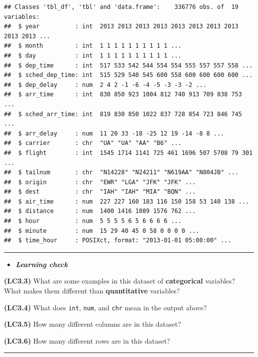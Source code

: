 \documentclass[]{tufte-book}
\let\oldrule=\rule
\renewcommand{\rule}[1]{\oldrule{\linewidth}}
\newenvironment{rmdblock}[1]
  {\begin{shaded*}
  \begin{itemize}
  \renewcommand{\labelitemi}{
    \raisebox{-.7\height}[0pt][0pt]{
    }
  }
  \item
  }
  {
  \end{itemize}
  \end{shaded*}
  }
\newenvironment{learncheck}
  {\begin{rmdblock}{warning}}
  {\end{rmdblock}}
\begin{document}
\begin{verbatim}
## Classes 'tbl_df', 'tbl' and 'data.frame':    336776 obs. of  19 variables:
##  $ year          : int  2013 2013 2013 2013 2013 2013 2013 2013 2013 2013 ...
##  $ month         : int  1 1 1 1 1 1 1 1 1 1 ...
##  $ day           : int  1 1 1 1 1 1 1 1 1 1 ...
##  $ dep_time      : int  517 533 542 544 554 554 555 557 557 558 ...
##  $ sched_dep_time: int  515 529 540 545 600 558 600 600 600 600 ...
##  $ dep_delay     : num  2 4 2 -1 -6 -4 -5 -3 -3 -2 ...
##  $ arr_time      : int  830 850 923 1004 812 740 913 709 838 753 ...
##  $ sched_arr_time: int  819 830 850 1022 837 728 854 723 846 745 ...
##  $ arr_delay     : num  11 20 33 -18 -25 12 19 -14 -8 8 ...
##  $ carrier       : chr  "UA" "UA" "AA" "B6" ...
##  $ flight        : int  1545 1714 1141 725 461 1696 507 5708 79 301 ...
##  $ tailnum       : chr  "N14228" "N24211" "N619AA" "N804JB" ...
##  $ origin        : chr  "EWR" "LGA" "JFK" "JFK" ...
##  $ dest          : chr  "IAH" "IAH" "MIA" "BQN" ...
##  $ air_time      : num  227 227 160 183 116 150 158 53 140 138 ...
##  $ distance      : num  1400 1416 1089 1576 762 ...
##  $ hour          : num  5 5 5 5 6 5 6 6 6 6 ...
##  $ minute        : num  15 29 40 45 0 58 0 0 0 0 ...
##  $ time_hour     : POSIXct, format: "2013-01-01 05:00:00" ...
\end{verbatim}

\begin{center}\rule{0.5\linewidth}{\linethickness}\end{center}

\begin{learncheck}
\textbf{\emph{Learning check}}
\end{learncheck}

\textbf{(LC3.3)} What are some examples in this dataset of
\textbf{categorical} variables? What makes them different than
\textbf{quantitative} variables?

\textbf{(LC3.4)} What does \texttt{int}, \texttt{num}, and \texttt{chr}
mean in the output above?

\textbf{(LC3.5)} How many different columns are in this dataset?

\textbf{(LC3.6)} How many different rows are in this dataset?

\begin{center}\rule{0.5\linewidth}{\linethickness}\end{center}
\end{document}
